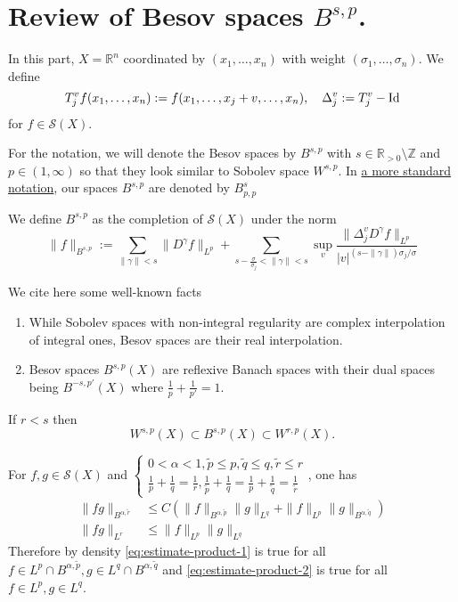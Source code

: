 \section{Review of Besov spaces \(B^{s,p}\).}
\label{sec:org9828763}
In this part, \(X = \mathbb{R}^n\) coordinated by \((x_1,\dots,x_n)\) with weight \((\sigma_1,\dots,\sigma_n)\). We define
\[
 T_j^v f(x_1,\dots,x_n) := f(x_1,\dots, x_j +v,\dots, x_n),\quad \Delta^v_j := T^v_j - {\rm Id}
\]
for \(f\in \mathcal{S}(X)\).

For the notation, we will denote the Besov spaces by \(B^{s,p}\) with \(s\in \mathbb{R}_{>0}\setminus
\mathbb{Z}\) and \(p\in (1,\infty)\) so that they look similar to Sobolev space \(W^{s,p}\). In \href{https://en.wikipedia.org/wiki/Besov\_space}{a more standard notation}, our spaces \(B^{s,p}\) are denoted by \(B^{s}_{p,p}\)

\begin{definition}
We define \(B^{s,p}\) as the completion of \(\mathcal{S}(X)\) under the norm
\[
\|f\|_{B^{s,p}} := \sum_{\|\gamma\| < s} \|D^\gamma f\|_{L^p} +
\sum_{ s- \frac{\sigma}{\sigma_j} < \|\gamma\| < s}\sup_{v} \frac{\|\Delta^v_j D^\gamma
f\|_{L^p}}{|v|^{(s - \|\gamma\|) \sigma_j/\sigma}}
\]
\end{definition}

We cite here some well-known facts
\begin{enumerate}
\item While Sobolev spaces with non-integral regularity are complex interpolation of integral
ones, Besov spaces are their real interpolation.
\item Besov spaces \(B^{s,p}(X)\) are reflexive Banach spaces with their dual spaces being
\(B^{-s,p'}(X)\) where \(\frac{1}{p} + \frac{1}{p'}=1\).
\end{enumerate}

\begin{theorem}
\label{thm:besov-sobolev}
If \(r < s\) then
\[
 W^{s,p}(X) \subset B^{s,p}(X) \subset W^{r,p}(X).
\]
\end{theorem}

\begin{theorem}[Multiplication]
\label{thm:estimate-product}
For \(f,g\in \mathcal{S}(X)\) and \(\begin{cases}
0<\alpha <1, \tilde p \leq p,\tilde q \leq q,\tilde r\leq r \\
\frac{1}{p} + \frac{1}{q} = \frac{1}{r}, \frac{1}{\tilde p} + \frac{1}{q} = \frac{1}{p} +
\frac{1}{\tilde q} = \frac{1}{\tilde r}				      
				       \end{cases}\),  one has
\begin{align}
\|fg\|_{B^{\alpha,\tilde r}} &\leq C \left( \|f\|_{B^{\alpha,\tilde p}}\|g\|_{L^q} + \|f\|_{L^p}\|g\|_{B^{\alpha,\tilde q}} \right) \label{eq:estimate-product-1} \\
\|fg\|_{L^r} &\leq \|f\|_{L^p}\|g\|_{L^q} \label{eq:estimate-product-2}
\end{align}
Therefore by density \eqref{eq:estimate-product-1} is true for all \(f\in L^p\cap
B^{\alpha,\tilde p}, g\in L^q\cap B^{\alpha,\tilde q}\) and \eqref{eq:estimate-product-2}
is true for all \(f\in L^p, g\in L^q\).
\end{theorem}

